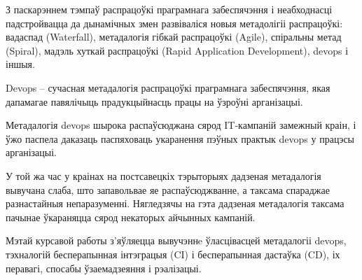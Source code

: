 \sectionWithoutNumber{\prefacename}
З паскарэннем тэмпаў распрацоўкі праграмнага забеспячэння і
неабходнасці падстройвацца да дынамічных змен
развіваліся новыя метадолігіі распрацоўкі: вадаспад (Waterfall),
метадалогія гібкай распрацоўкі (Agile), спіральны метад (Spiral),
мадэль хуткай распрацоўкі (Rapid Application Development), devops і іншыя.


Devops -- сучасная метадалогія распрацоўкі праграмнага забеспячэння, якая
дапамагае павялічыць прадукцыйнасць працы на ўзроўні арганізацыі.

Метадалогія devops шырока распаўсюджана сярод IT-кампаній замежный краін,
і ўжо паспела даказаць паспяховаць укаранення пэўных практык devops
у працэсы арганізацыі.

У той жа час у краінах на постсавецкіх тэрыторыях дадзеная метадалогія
вывучана слаба, што запавольвае яе распаўсюджванне, а таксама спараджае
разнастайныя непаразуменні.
Нягледзячы на гэта дадзеная метадалогія таксама пачынае ўкараняцца сярод
некаторых айчынных кампаній.

Мэтай курсавой работы з'яўляецца вывучэннe ўласцівасцей метадалогіі devops,
тэхналогій бесперапынная інтэграцыя (CI) і бесперапынная дастаўка (CD),
іх перавагі, спосабы ўзаемадзеяння і рэалізацыі.

\clearpage
